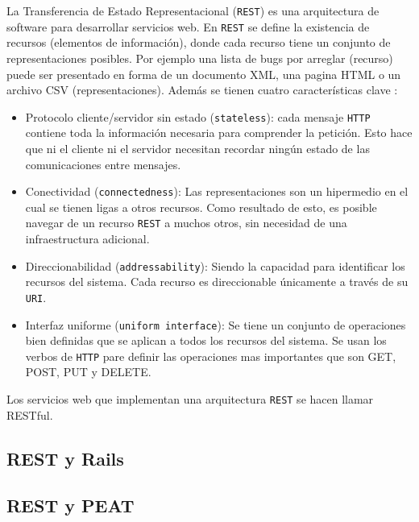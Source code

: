 La Transferencia de Estado Representacional (\texttt{REST}) es una arquitectura
de software para desarrollar servicios web. En \texttt{REST} se define la
existencia de recursos (elementos de información), donde cada recurso tiene un
conjunto de representaciones posibles. Por ejemplo una lista de bugs por arreglar
(recurso) puede ser presentado en forma de un documento XML, una pagina HTML
o un archivo CSV (representaciones). Además se tienen cuatro características
clave \cite[pag.~79]{1_richardson_2007}:

\begin{itemize}
\item Protocolo cliente/servidor sin estado (\texttt{stateless}): cada mensaje
  \texttt{HTTP} contiene toda la información necesaria para comprender la
  petición. Esto hace que ni el cliente ni el servidor necesitan recordar ningún
  estado de las comunicaciones entre mensajes.
\item Conectividad (\texttt{connectedness}): Las representaciones son un hipermedio
  en el cual se tienen ligas a otros recursos. Como resultado de esto, es posible
  navegar de un recurso \texttt{REST} a muchos otros, sin necesidad de una
  infraestructura adicional.
\item Direccionabilidad (\texttt{addressability}): Siendo la capacidad para
  identificar los recursos del sistema. Cada recurso es direccionable únicamente
  a través de su \texttt{URI}.
\item Interfaz uniforme (\texttt{uniform interface}): Se tiene un conjunto de
  operaciones bien definidas que se aplican a todos los recursos del sistema.
  Se usan los verbos de \texttt{HTTP} pare definir las operaciones mas importantes
  que son GET, POST, PUT y DELETE.
\end{itemize}

Los servicios web que implementan una arquitectura \texttt{REST} se hacen llamar
RESTful.

\subsection{REST y Rails}

\subsection{REST y PEAT}
